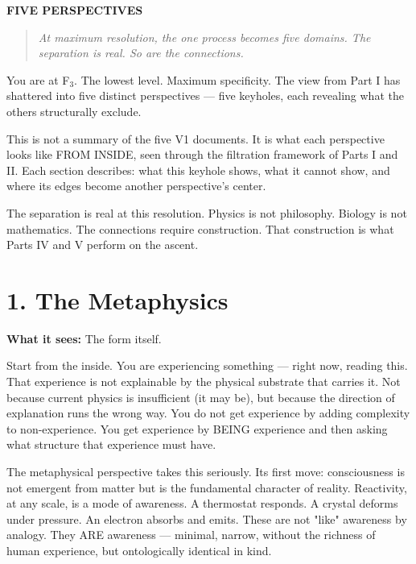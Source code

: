 \vspace{1cm}
\begin{center}
{\Large\sffamily\bfseries\color{headerblue} FIVE PERSPECTIVES}
\end{center}
\vspace{0.5cm}


\begin{quote}
\itshape
\textit{At maximum resolution, the one process becomes five domains. The separation is real. So are the connections.}
\end{quote}


\bigskip\noindent\makebox[\textwidth]{\color{rulegray}\rule{5cm}{0.3pt}}\bigskip


You are at F$_3$. The lowest level. Maximum specificity. The view from Part I has shattered into five distinct perspectives — five keyholes, each revealing what the others structurally exclude.


This is not a summary of the five V1 documents. It is what each perspective looks like FROM INSIDE, seen through the filtration framework of Parts I and II. Each section describes: what this keyhole shows, what it cannot show, and where its edges become another perspective's center.


The separation is real at this resolution. Physics is not philosophy. Biology is not mathematics. The connections require construction. That construction is what Parts IV and V perform on the ascent.


\bigskip\noindent\makebox[\textwidth]{\color{rulegray}\rule{5cm}{0.3pt}}\bigskip


\section*{1. The Metaphysics}


\textbf{What it sees:} The form itself.


Start from the inside. You are experiencing something — right now, reading this. That experience is not explainable by the physical substrate that carries it. Not because current physics is insufficient (it may be), but because the direction of explanation runs the wrong way. You do not get experience by adding complexity to non-experience. You get experience by BEING experience and then asking what structure that experience must have.


The metaphysical perspective takes this seriously. Its first move: consciousness is not emergent from matter but is the fundamental character of reality. Reactivity, at any scale, is a mode of awareness. A thermostat responds. A crystal deforms under pressure. An electron absorbs and emits. These are not "like" awareness by analogy. They ARE awareness — minimal, narrow, without the richness of human experience, but ontologically identical in kind.


